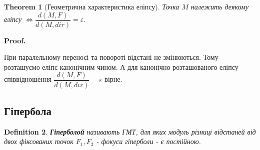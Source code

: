 \documentclass[a4paper, 10pt]{extarticle}
\makeatletter
\def\qed{$\blacksquare$}
\def\qed{$\blacksquare$}
\theoremstyle{theoremdd}
\newtheorem{theorem}{Theorem}[subsection]
\theoremstyle{theoremdd}
\newtheorem{definition}[theorem]{Definition}
\theoremstyle{theoremdd}
\theoremstyle{theoremdd}
\theoremstyle{theoremdd}
\theoremstyle{theoremdd}
\theoremstyle{theoremdd}
\theoremstyle{theoremdd}
\renewenvironment{proof}[1][Proof.\\]{\par
\pushQED{\hfill \qed}%
\normalfont \topsep6\p@\@plus6\p@\relax
\trivlist
\item\relax
{\bfseries
#1\@addpunct{.}}\hspace\labelsep\ignorespaces
}{%
\popQED\endtrivlist\@endpefalse
}
\makeatother
\begin{document}
\begin{theorem}[Геометрична характеристика еліпсу]
Точка $M$ належить деякому еліпсу $\iff \dfrac{d(M,F)}{d(M,dir)} = \varepsilon$.
\end{theorem}

\begin{proof}
При паралельному переносі та повороті відстані не змінюються. Тому розташуємо еліпс канонічним чином. А для канонічно розташованого еліпсу співвідношення $\dfrac{d(M,F)}{d(M,dir)} = \varepsilon$ вірне.
\end{proof}

\subsection{Гіпербола}
\begin{definition}
\textbf{Гіперболой} називають ГМТ, для яких модуль різниці відстаней від двох фіксованих точок $F_1,F_2$ - фокуси гіперболи - є постійною.
\end{definition}
\end{document}
